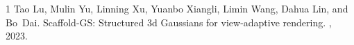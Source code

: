 \begin{thebibliography}{1}
Tao Lu, Mulin Yu, Linning Xu, Yuanbo Xiangli, Limin Wang, Dahua Lin, and Bo~Dai.
\newblock Scaffold-GS: Structured 3d Gaussians for view-adaptive rendering.
, 2023.









\end{thebibliography}